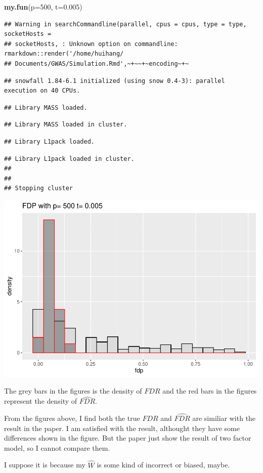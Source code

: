 \documentclass[]{article}
\newenvironment{Shaded}{\begin{snugshade}}{\end{snugshade}}
\newcommand{\DataTypeTok}[1]{\textcolor[rgb]{0.13,0.29,0.53}{#1}}
\newcommand{\DecValTok}[1]{\textcolor[rgb]{0.00,0.00,0.81}{#1}}
\newcommand{\FloatTok}[1]{\textcolor[rgb]{0.00,0.00,0.81}{#1}}
\newcommand{\KeywordTok}[1]{\textcolor[rgb]{0.13,0.29,0.53}{\textbf{#1}}}
\newcommand{\NormalTok}[1]{#1}
\begin{document}
\begin{Shaded}
\begin{Highlighting}[]
\KeywordTok{my.fun}\NormalTok{(}\DataTypeTok{p=}\DecValTok{500}\NormalTok{, }\DataTypeTok{t=}\FloatTok{0.005}\NormalTok{)}
\end{Highlighting}
\end{Shaded}

\begin{verbatim}
## Warning in searchCommandline(parallel, cpus = cpus, type = type, socketHosts =
## socketHosts, : Unknown option on commandline: rmarkdown::render('/home/huihang/
## Documents/GWAS/Simulation.Rmd',~+~~+~encoding~+~
\end{verbatim}

\begin{verbatim}
## snowfall 1.84-6.1 initialized (using snow 0.4-3): parallel execution on 40 CPUs.
\end{verbatim}

\begin{verbatim}
## Library MASS loaded.
\end{verbatim}

\begin{verbatim}
## Library MASS loaded in cluster.
\end{verbatim}

\begin{verbatim}
## Library L1pack loaded.
\end{verbatim}

\begin{verbatim}
## Library L1pack loaded in cluster.
## 
## 
## Stopping cluster
\end{verbatim}

\includegraphics{Simulation_files/figure-latex/unnamed-chunk-1-4.pdf}

The grey bars in the figures is the density of \(FDR\) and the red bars
in the figures represent the density of \(\widehat{FDR}\).

From the figures above, I find both the true \(FDR\) and \(\widehat{FDR}\) are similiar with the result in the paper. 
I am satisfied with the result, althought they have some differences shown in the figure. 
But the paper just show the result of two factor model, so I cannot compare them.

I suppose it is because my \(\hat{W}\) is some kind of incorrect or biased, maybe. 
\end{document}

